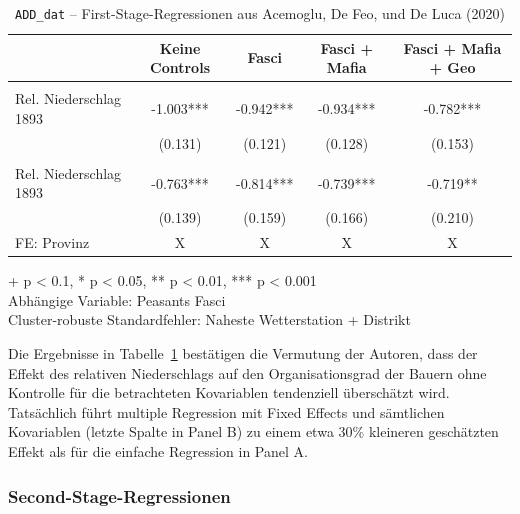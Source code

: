 \documentclass[
  a4paper,
  DIV=11,
  oneside]{scrreprt}
\begin{document}
\begingroup
\setlength{}
\setlength{}\fontsize{12.0pt}{14.4pt}\selectfont
\setlength{\LTpost}{0mm}

\begin{longtable}{@{\extracolsep{\fill}}lcccc}

\caption{\label{tbl-addfs}\texttt{ADD\_dat} -- First-Stage-Regressionen
aus Acemoglu, De Feo, und De Luca (2020)}

\tabularnewline

\toprule
  & Keine Controls & Fasci & Fasci + Mafia & Fasci + Mafia + Geo \\ 
\midrule\addlinespace[2.5pt]
\multicolumn{5}{>{\raggedright\arraybackslash}m{0.8\linewidth}}{Panel A} \\[2.5pt] 
\midrule\addlinespace[2.5pt]
Rel. Niederschlag 1893 & -1.003*** & -0.942*** & -0.934*** & -0.782*** \\ 
 & (0.131) & (0.121) & (0.128) & (0.153) \\ 
\midrule\addlinespace[2.5pt]
\multicolumn{5}{>{\raggedright\arraybackslash}m{0.8\linewidth}}{Panel B (Fixed Effects)} \\[2.5pt] 
\midrule\addlinespace[2.5pt]
Rel. Niederschlag 1893 & -0.763*** & -0.814*** & -0.739*** & -0.719** \\ 
 & (0.139) & (0.159) & (0.166) & (0.210) \\ 
FE: Provinz & X & X & X & X \\ 
\bottomrule

\end{longtable}

\begin{minipage}{\linewidth}
+ p < 0.1, * p < 0.05, ** p < 0.01, *** p < 0.001\\
Abhängige Variable: Peasants Fasci\\
Cluster-robuste Standardfehler: Naheste Wetterstation + Distrikt\\
\end{minipage}
\endgroup

Die Ergebnisse in Tabelle~\ref{tbl-addfs} bestätigen die Vermutung der
Autoren, dass der Effekt des relativen Niederschlags auf den
Organisationsgrad der Bauern ohne Kontrolle für die betrachteten
Kovariablen tendenziell überschätzt wird. Tatsächlich führt multiple
Regression mit Fixed Effects und sämtlichen Kovariablen (letzte Spalte
in Panel B) zu einem etwa 30\% kleineren geschätzten Effekt als für die
einfache Regression in Panel A.

\subsubsection{Second-Stage-Regressionen}\label{second-stage-regressionen}
\end{document}
